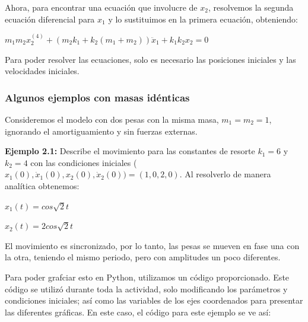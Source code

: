 \documentclass[a4paper]{article}
\begin{document}
Ahora, para encontrar una ecuación que involucre de $x_2$, resolvemos la segunda ecuación diferencial para $x_1$ y lo sustituimos en la primera ecuación, obteniendo:

\begin{center}
$m_1m_2x_2^{(4)} + (m_2k_1 + k_2(m_1 + m_2))\ddot x_1 + k_1k_2x_2 = 0$
\end{center}

Para poder resolver las ecuaciones, solo es necesario las posiciones iniciales y las velocidades iniciales.

\subsubsection{Algunos ejemplos con masas idénticas}
Consideremos el modelo con dos pesas con la misma masa, $m_1 = m_2 = 1$, ignorando el amortiguamiento y sin fuerzas externas.

\textbf{Ejemplo 2.1:} Describe el movimiento para las constantes de resorte $k_1 = 6$ y $k_2 = 4$ con las condiciones iniciales ($x_1(0), \dot x_1(0), x_2(0), \dot x_2(0)) = (1,0,2,0)$.
Al resolverlo de manera analítica obtenemos:
\begin{center}
$x_1(t) = cos \sqrt{2}t$

$x_2(t) = 2 cos \sqrt{2}t$
\end{center}

El movimiento es sincronizado, por lo tanto, las pesas se mueven en fase una con la otra, teniendo el mismo periodo, pero con amplitudes un poco diferentes. 

Para poder grafciar esto en Python, utilizamos un código proporcionado. Este código se utilizó durante toda la actividad, solo modificando los parámetros y condiciones iniciales; así como las variables de los ejes coordenados para presentar las diferentes gráficas. En este caso, el código para este ejemplo se ve así:
\end{document}
